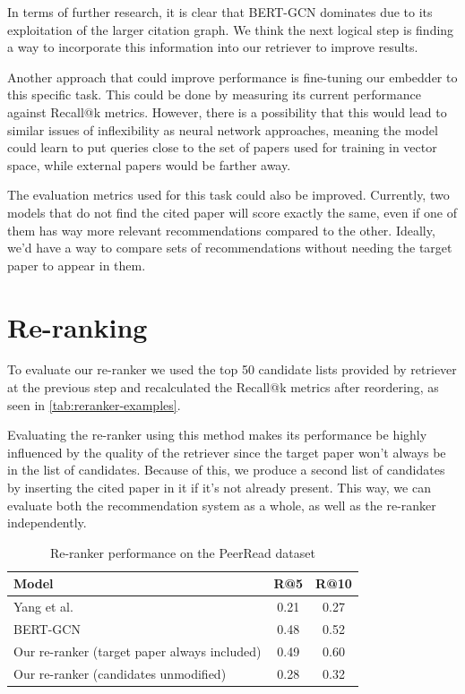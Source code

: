 \documentclass[12pt,a4paper]{report}
\begin{document}
In terms of further research, it is clear that BERT-GCN \cite{Jeong2019ACC} dominates due to its exploitation of the larger citation graph. We think the next logical step is finding a way to incorporate this information into our retriever to improve results.

Another approach that could improve performance is fine-tuning our embedder to this specific task. This could be done by measuring its current performance against Recall@k metrics. However, there is a possibility that this would lead to similar issues of inflexibility as neural network approaches, meaning the model could learn to put queries close to the set of papers used for training in vector space, while external papers would be farther away.

The evaluation metrics used for this task could also be improved. Currently, two models that do not find the cited paper will score exactly the same, even if one of them has way more relevant recommendations compared to the other. Ideally, we'd have a way to compare sets of recommendations without needing the target paper to appear in them.

\section{Re-ranking}

To evaluate our re-ranker we used the top 50 candidate lists provided by retriever at the previous step and recalculated the Recall@k metrics after reordering, as seen in \autoref{tab:reranker-examples}.

Evaluating the re-ranker using this method makes its performance be highly influenced by the quality of the retriever since the target paper won't always be in the list of candidates. Because of this, we produce a second list of candidates by inserting the cited paper in it if it's not already present. This way, we can evaluate both the recommendation system as a whole, as well as the re-ranker independently.

\begin{table}[th]
\centering
\small
\setlength{\tabcolsep}{12pt}
\renewcommand{\arraystretch}{1.2}
\begin{tabular}{lcc}
\toprule
\textbf{Model} & \textbf{R@5} & \textbf{R@10} \\
\midrule
Yang et al. \cite{Yang2018ALB} & 0.21 & 0.27 \\
BERT-GCN \cite{Jeong2019ACC} & 0.48 & 0.52 \\
Our re-ranker (target paper always included) & 0.49 & 0.60 \\
Our re-ranker (candidates unmodified) & 0.28 & 0.32 \\
    \bottomrule
\end{tabular}
\caption{Re-ranker performance on the PeerRead dataset}
\label{tab:reranker-eval}
\end{table}
\end{document}
